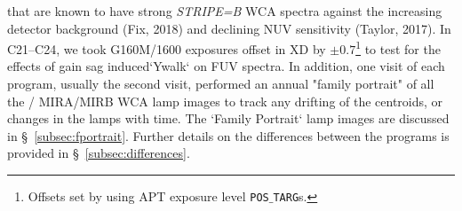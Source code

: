 that are known to have strong \textit{STRIPE=B} WCA spectra against the increasing detector background (Fix, 2018) and declining NUV sensitivity (Taylor, 2017).
In C21--C24, we took G160M/1600 exposures offset in XD by $\pm 0.7$\arcsec\footnote{Offsets set by using APT exposure level \texttt{POS$\_$TARG}s.} to test for the effects of gain sag induced`Ywalk` on FUV spectra.
In addition, one visit of each program, usually the second visit, performed an annual "family portrait"  of all the \plampone{}/\plamptwo{} MIRA/MIRB WCA lamp images to track any drifting of the centroids, or changes in the lamps with time.
The `Family Portrait` lamp images are discussed in \S~\ref{subsec:fportrait}.
Further details on the differences between the programs is provided in \S~\ref{subsec:differences}.
